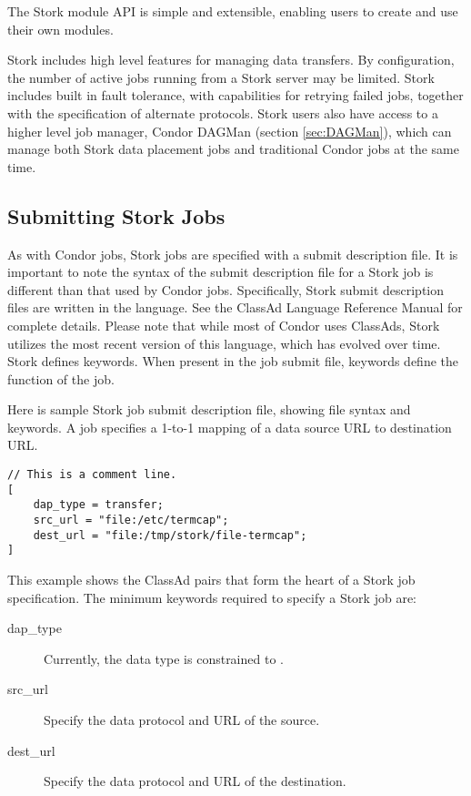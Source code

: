 The Stork
module API is simple and extensible, enabling users to create 
and use their own modules.

Stork includes high level features for managing data transfers.
By configuration, the number of active jobs running
from a Stork server may be limited.
Stork includes built in fault tolerance,
with capabilities for retrying failed jobs,
together with the specification of alternate protocols.
Stork users also have access to a higher level job manager, 
Condor DAGMan (section \ref{sec:DAGMan}),
which can manage both Stork data placement jobs
and traditional Condor jobs at the same time.


\subsection{\label{sec:Stork-Job-Submission}Submitting Stork Jobs}

As with Condor jobs, Stork jobs are specified with a
submit description file.
It is important to note the syntax of the submit description file
for a Stork job is different than that used by Condor jobs.
Specifically,
Stork submit description files are written in the
language.  
See the ClassAd Language Reference Manual for complete details.
Please note that while most of Condor uses ClassAds,
Stork utilizes the most recent version of this language,
which has evolved over time.
Stork defines keywords.
When present in the job submit file,
keywords define the function of the job.

Here is sample Stork job submit description file,
showing file syntax and keywords.
A job specifies a 1-to-1 mapping of a data source URL to
destination URL.

\footnotesize
\begin{verbatim}
// This is a comment line.
[
    dap_type = transfer;
    src_url = "file:/etc/termcap";
    dest_url = "file:/tmp/stork/file-termcap";
]
\end{verbatim}
\normalsize


This example shows the ClassAd pairs that form the
heart of a Stork job specification.
The minimum keywords required to specify a Stork job are:

\begin{description}
  \item[dap\_type] Currently, the data type is constrained to 
  .

  \item[src\_url]  Specify the data protocol and URL of the source.

  \item[dest\_url]  Specify the data protocol and URL of the destination.
\end{description}

